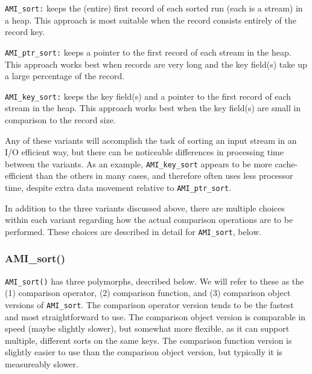 \begin{description}
\item\lstinline|AMI_sort:| keeps the (entire) first record of each
  sorted run (each is a stream) in a heap. This approach is most
  suitable when the record consists entirely of the record key.
  
\item\lstinline|AMI_ptr_sort:| keeps a pointer to the first record of
  each stream in the heap. This approach works best when records are
  very long and the key field(s) take up a large percentage of the
  record.
  
\item\lstinline|AMI_key_sort:| keeps the key field(s) and a pointer to
  the first record of each stream in the heap. This approach works
  best when the key field(s) are small in comparison to the record
  size.
\end{description}

Any of these variants will accomplish the task of sorting an input
stream in an I/O efficient way, but there can be noticeable
differences in processing time between the variants. As an example,
\lstinline|AMI_key_sort| appears to be more cache-efficient than the
others in many cases, and therefore often uses less processor time,
despite extra data movement relative to \lstinline|AMI_ptr_sort|.

In addition to the three variants discussed above, there are
multiple choices within each variant regarding how the
actual comparison operations are to be performed. These
choices are described in detail for \lstinline|AMI_sort|, below.

\subsubsection{AMI\_sort()}
\lstinline|AMI_sort()| has three polymorphs, described below.
We will refer to these as the (1) comparison operator, (2)
comparison function, and (3) comparison object versions of
\lstinline|AMI_sort|. The comparison operator version tends to
be the fastest and most straightforward to use. The
comparison object version is comparable in speed (maybe
slightly slower), but somewhat more flexible, as it can support
multiple, different sorts on the same keys. The comparison
function version is slightly easier to use than the
comparison object version, but typically it is measureably slower.


